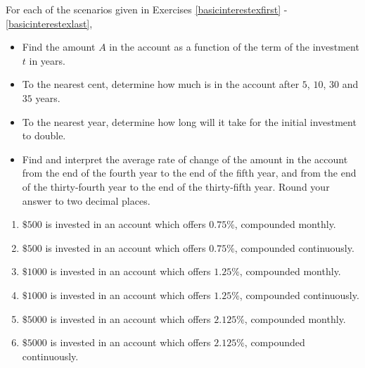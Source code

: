 \documentclass{ximera}
\begin{document}
	\author{Stitz-Zeager}


\label{ExercisesforApplicationsofExponentialandLogarithmicFunctions}

For each of the scenarios given in Exercises \ref{basicinterestexfirst} - \ref{basicinterestexlast}, 

\begin{itemize}

\item  Find the amount $A$ in the account as a function of the term of the investment $t$ in years. 

\item  To the nearest cent, determine how much is in the account after $5$, $10$, $30$ and $35$ years.  

\item  To the nearest year, determine how long will it take for the initial investment to double.  

\item  Find and interpret the average rate of change of the amount in the account from the end of
the fourth year to the end of the fifth year, and from the end of the thirty-fourth year to the
end of the thirty-fifth year.  Round your answer to two decimal places.

\end{itemize} 

\begin{enumerate}

\item  $\$500$ is invested in an account which offers $0.75 \%$, compounded monthly. \label{basicinterestexfirst}

\item  $\$500$ is invested in an account which offers $0.75 \%$, compounded continuously.

\item  $\$1000$ is invested in an account which offers $1.25 \%$, compounded monthly.

\item  $\$1000$ is invested in an account which offers $1.25 \%$, compounded continuously.

\item  $\$5000$ is invested in an account which offers $2.125 \%$, compounded monthly.

\item  $\$5000$ is invested in an account which offers $2.125 \%$, compounded continuously. \label{basicinterestexlast}

\setcounter{HW}{\value{enumi}}
\end{enumerate}
\end{document}
